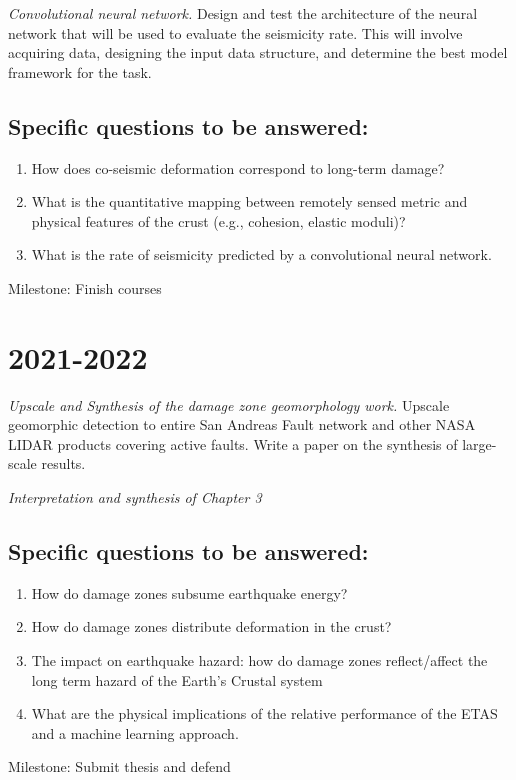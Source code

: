 \documentclass[12pt, notitlepage]{report}
\begin{document}
\textit{Convolutional neural network.} Design and test the architecture of the neural network that will be used to evaluate the seismicity rate. This will involve acquiring data, designing the input data structure, and determine the best model framework for the task.


\subsection*{Specific questions to be answered:}
\begin{enumerate}
    \item How does co-seismic deformation correspond to long-term damage?
    \item What is the quantitative mapping between remotely sensed metric and physical features of the crust (e.g., cohesion, elastic moduli)?
    \item What is the rate of seismicity predicted by a convolutional neural network.
\end{enumerate}

Milestone: Finish courses

\section*{2021-2022}

\textit{Upscale and Synthesis of the damage zone geomorphology work.} Upscale geomorphic detection to entire San Andreas Fault network and other NASA LIDAR products covering active faults. Write a paper on the synthesis of large-scale results.

\textit{Interpretation and synthesis of Chapter 3}

\subsection*{Specific questions to be answered:}
\begin{enumerate}
    \item How do damage zones subsume earthquake energy?
    \item How do damage zones distribute deformation in the crust?
    \item The impact on earthquake hazard: how do damage zones reflect/affect the long term hazard of the Earth’s Crustal system
    \item What are the physical implications of the relative performance of the ETAS and a machine learning approach.
\end{enumerate}

Milestone: Submit thesis and defend 

{\footnotesize
\printbibliography}
\end{document}

